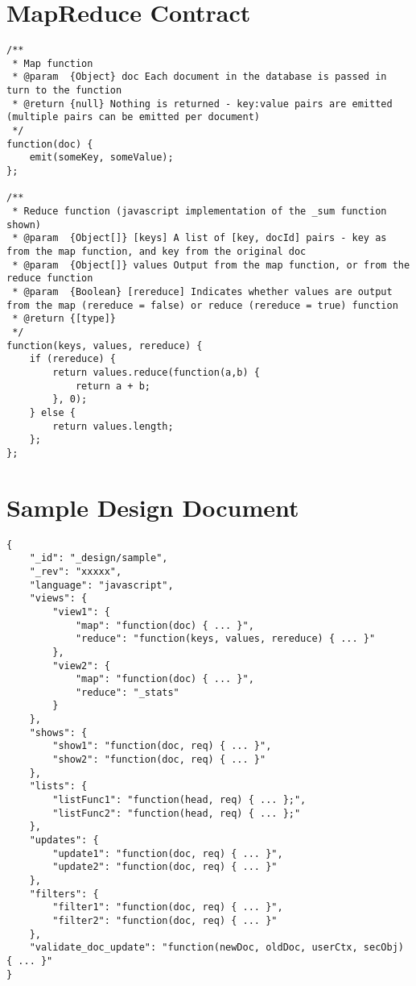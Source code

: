 \section{MapReduce Contract}
\label{couchdb-mapreduce-contracts}
\begin{verbatim}
/**
 * Map function
 * @param  {Object} doc Each document in the database is passed in turn to the function
 * @return {null} Nothing is returned - key:value pairs are emitted (multiple pairs can be emitted per document)
 */
function(doc) {
    emit(someKey, someValue);
};

/**
 * Reduce function (javascript implementation of the _sum function shown)
 * @param  {Object[]} [keys] A list of [key, docId] pairs - key as from the map function, and key from the original doc
 * @param  {Object[]} values Output from the map function, or from the reduce function
 * @param  {Boolean} [rereduce] Indicates whether values are output from the map (rereduce = false) or reduce (rereduce = true) function
 * @return {[type]}
 */
function(keys, values, rereduce) {
    if (rereduce) {
        return values.reduce(function(a,b) {
            return a + b;
        }, 0);
    } else {
        return values.length;
    };
};
\end{verbatim}

\section{Sample Design Document}
\label{couchdb-design-doc-sample}
\begin{verbatim}
{
    "_id": "_design/sample",
    "_rev": "xxxxx",
    "language": "javascript",
    "views": {
        "view1": {
            "map": "function(doc) { ... }",
            "reduce": "function(keys, values, rereduce) { ... }"
        },
        "view2": {
            "map": "function(doc) { ... }",
            "reduce": "_stats"            
        }
    },
    "shows": {
        "show1": "function(doc, req) { ... }",
        "show2": "function(doc, req) { ... }"
    },
    "lists": {
        "listFunc1": "function(head, req) { ... };",
        "listFunc2": "function(head, req) { ... };"
    },
    "updates": {
        "update1": "function(doc, req) { ... }",
        "update2": "function(doc, req) { ... }"
    },
    "filters": {
        "filter1": "function(doc, req) { ... }",
        "filter2": "function(doc, req) { ... }"
    },
    "validate_doc_update": "function(newDoc, oldDoc, userCtx, secObj) { ... }"
}
\end{verbatim}

